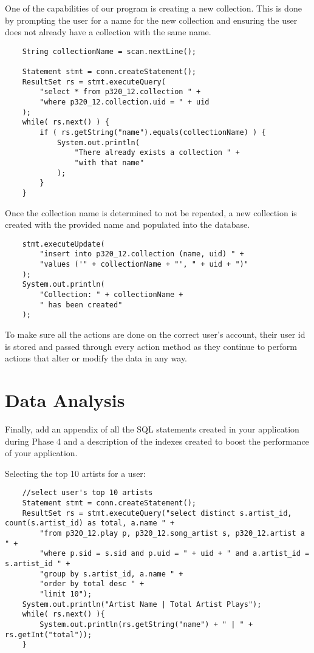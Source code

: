 \documentclass[12pt]{article}
\begin{document}
    One of the capabilities of our program is creating a new collection.
    This is done by prompting the user for a name for the new collection
    and ensuring the user does not already have a collection with the same
    name.
    \begin{lstlisting}
    String collectionName = scan.nextLine();

    Statement stmt = conn.createStatement();
    ResultSet rs = stmt.executeQuery(
        "select * from p320_12.collection " +
        "where p320_12.collection.uid = " + uid
    );
    while( rs.next() ) {
        if ( rs.getString("name").equals(collectionName) ) {
            System.out.println(
                "There already exists a collection " +
                "with that name"
            );
        }
    }
    \end{lstlisting}
    Once the collection name is determined to not be repeated, a new collection
    is created with the provided name and populated into the database.
    \begin{lstlisting}
    stmt.executeUpdate(
        "insert into p320_12.collection (name, uid) " +
        "values ('" + collectionName + "', " + uid + ")"
    );
    System.out.println(
        "Collection: " + collectionName +
        " has been created"
    );
    \end{lstlisting}
    To make sure all the actions are done on the correct user's account, their
    user id is stored and passed through every action method as they continue to perform
    actions that alter or modify the data in any way.



    \section{Data Analysis}
    Finally, add an appendix of all the SQL statements
    created in your application during Phase 4 and a description of the indexes created to
    boost the performance of your application.
    
    Selecting the top 10 artists for a user:
    \begin{lstlisting}
    //select user's top 10 artists
    Statement stmt = conn.createStatement();
    ResultSet rs = stmt.executeQuery("select distinct s.artist_id, count(s.artist_id) as total, a.name " +
        "from p320_12.play p, p320_12.song_artist s, p320_12.artist a " +
        "where p.sid = s.sid and p.uid = " + uid + " and a.artist_id = s.artist_id " +
        "group by s.artist_id, a.name " +
        "order by total desc " +
        "limit 10");
    System.out.println("Artist Name | Total Artist Plays");
    while( rs.next() ){
        System.out.println(rs.getString("name") + " | " + rs.getInt("total"));
    }
    \end{lstlisting}
    
\end{document}
